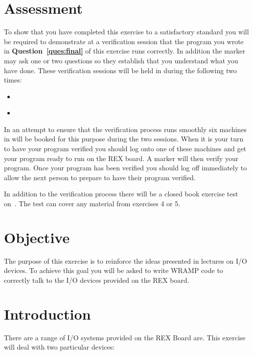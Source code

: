 \documentclass[a4paper,10pt]{article}
\begin{document}



\section{Assessment}

To show that you have completed this exercise to a satisfactory
standard you will be required to demonstrate at a verification session
that the program you wrote in \textbf{Question~\ref{ques:final}} of this exercise
runs correctly. In addition the marker may ask one or two questions so
they establish that you understand what you have done.  These
verification sessions will be held in \ASSESSROOM during the following two
times: 

\begin{itemize}
\item \IODUE~\MORNINGASSESS
\item \IODUE~\AFTERNOONASSESS
\end{itemize}

In an attempt to ensure that the verification process runs smoothly
six machines in \ASSESSROOM will be booked for this purpose during the two
sessions. When it is your turn to have your program verified you
should log onto one of these machines and get your program ready to
run on the REX board. A marker will then verify your program. Once
your program has been verified you should log off immediately to allow
the next person to prepare to have their program verified.

In addition to the verification process there will be a closed book
exercise test on~\textbf{\IOTEST}. The test can cover any material
from exercises 4 or 5.

\section{Objective}

The purpose of this exercise is to reinforce the ideas presented in
lectures on I/O devices. To achieve this goal you will be asked to
write WRAMP code to correctly talk to the I/O devices provided on the
REX board.

\section{Introduction}
There are a range of I/O systems provided on the REX Board are. This
exercise will deal with two particular devices:
\end{document}
